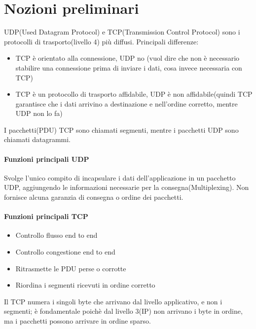 \section{Nozioni preliminari}
UDP(Used Datagram Protocol) e TCP(Transmission Control Protocol) sono i protocolli di trasporto(livello 4) più diffusi.
Principali differenze:
\begin{itemize}
    \item TCP è orientato alla connessione, UDP no (vuol dire che non è necessario stabilire una connessione prima di inviare i dati, cosa invece necessaria con TCP)
    \item TCP è un protocollo di trasporto affidabile, UDP è non affidabile(quindi TCP garantisce che i dati arrivino a destinazione e nell'ordine corretto, mentre UDP non lo fa)
\end{itemize}

I pacchetti(PDU) TCP sono chiamati segmenti, mentre i pacchetti UDP sono chiamati datagrammi.

\paragraph{Funzioni principali UDP}
Svolge l'unico compito di incapsulare i dati dell'applicazione in un pacchetto UDP, aggiungendo le informazioni necessarie per la consegna(Multiplexing). Non fornisce alcuna garanzia di consegna o ordine dei pacchetti.
\paragraph{Funzioni principali TCP}
\begin{itemize}
    \item Controllo flusso end to end
    \item Controllo congestione end to end
    \item Ritrasmette le PDU perse o corrotte
    \item Riordina i segmenti ricevuti in ordine corretto
\end{itemize}
Il TCP numera i singoli byte che arrivano dal livello applicativo, e non i segmenti; è fondamentale poichè dal livello 3(IP) non arrivano i byte in ordine, ma i pacchetti possono arrivare in ordine sparso.

